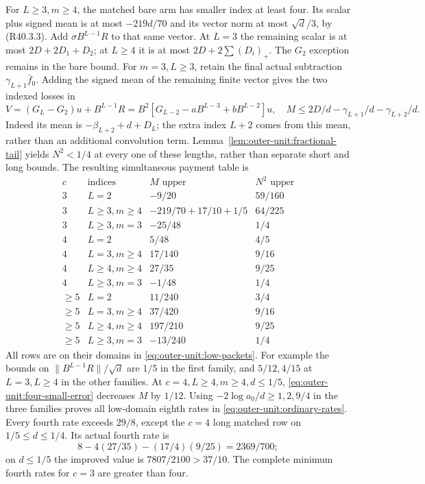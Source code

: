 For \(L\ge3,m\ge4\), the matched bare arm has smaller index at least
four. Its scalar plus signed mean is at most \(-219d/70\) and its
vector norm at most \(\sqrt d/3\), by (R40.3.3).
Add \(\sigma B^{L-1}R\) to that same vector. At \(L=3\) the remaining
scalar is at most \(2D+2D_1+D_2\); at \(L\ge4\) it is at most
\(2D+2\sum(D_i)_+\). The \(G_2\) exception remains in the bare bound.
For \(m=3,L\ge3\), retain the final actual subtraction
\(\gamma_{L+1}\bar f_0\). Adding the signed mean of the remaining
finite vector gives the two indexed losses in
\begin{equation}\label{eq:outer-unit:three-vector}
 V=(G_L-G_2)u+B^{L-1}R
   =B^2[G_{L-2}-aB^{L-3}+bB^{L-2}]u,
 \quad M\le2D/d-\gamma_{L+1}/d-\gamma_{L+2}/d.
\end{equation}
Indeed its mean is \(-\beta_{L+2}+d+D_L\); the extra index \(L+2\)
comes from this mean, rather than an additional convolution term.
Lemma~\ref{lem:outer-unit:fractional-tail} yields \(N^2<1/4\) at
every one of these lengths, rather than separate short and long bounds.
The resulting simultaneous payment table is
\begin{equation}\label{eq:outer-unit:connector-table}
\begin{array}{c|c|c|c}
 c&\text{indices}&M\text{ upper}&N^2\text{ upper}\\\hline
 3&L=2&-9/20&59/160\\
 3&L\ge3,m\ge4&-219/70+17/10+1/5&64/225\\
 3&L\ge3,m=3&-25/48&1/4\\\hline
 4&L=2&5/48&4/5\\
 4&L=3,m\ge4&17/140&9/16\\
 4&L\ge4,m\ge4&27/35&9/25\\
 4&L\ge3,m=3&-1/48&1/4\\\hline
 \ge5&L=2&11/240&3/4\\
 \ge5&L=3,m\ge4&37/420&9/16\\
 \ge5&L\ge4,m\ge4&197/210&9/25\\
 \ge5&L\ge3,m=3&-13/240&1/4
\end{array}
\end{equation}
All rows are on their domains in \eqref{eq:outer-unit:low-packets}.
For example the bounds on \(\|B^{L-1}R\|/\sqrt d\) are \(1/5\)
in the first family, and \(5/12,4/15\) at \(L=3,L\ge4\) in the
other families. At \(c=4,L\ge4,m\ge4,d\le1/5\),
\eqref{eq:outer-unit:four-small-error} decreases \(M\) by \(1/12\).
Using \(-2\log a_0/d\ge1,2,9/4\) in the three families proves all
low-domain eighth rates in \eqref{eq:outer-unit:ordinary-rates}.
Every fourth rate exceeds \(29/8\), except the \(c=4\) long matched
row on \(1/5\le d\le1/4\). Its actual fourth rate is
\begin{equation}\label{eq:outer-unit:curved-long-four}
 8-4(27/35)-(17/4)(9/25)=2369/700;
\end{equation}
on \(d\le1/5\) the improved value is \(7807/2100>37/10\).
The complete minimum fourth rates for \(c=3\) are greater than four.

